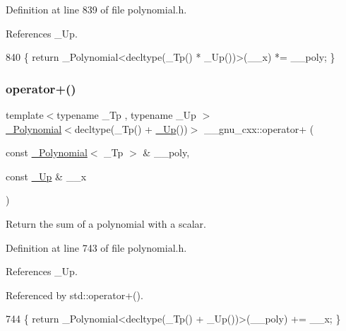 Definition at line 839 of file polynomial.\+h.



References \+\_\+\+Up.


\begin{DoxyCode}
840     \{ \textcolor{keywordflow}{return} \_Polynomial<decltype(\_Tp() * \_Up())>(\_\_x) *= \_\_poly; \}
\end{DoxyCode}
\mbox{\label{namespace____gnu__cxx_a2b408e7a7e5d2ec6879b8e40f7f5de3e}} 
\subsubsection{\texorpdfstring{operator+()}{operator+()}\hspace{0.1cm}{\footnotesize\ttfamily [1/3]}}
{\footnotesize\ttfamily template$<$typename \+\_\+\+Tp , typename \+\_\+\+Up $>$ \\
\hyperlink{class____gnu__cxx_1_1__Polynomial}{\+\_\+\+Polynomial}$<$decltype(\+\_\+\+Tp() + \hyperlink{namespace____gnu__cxx_ab693ea357b6429b331e0bf09f9442385}{\+\_\+\+Up}())$>$ \+\_\+\+\_\+gnu\+\_\+cxx\+::operator+ (\begin{DoxyParamCaption}\item[{const \hyperlink{class____gnu__cxx_1_1__Polynomial}{\+\_\+\+Polynomial}$<$ \+\_\+\+Tp $>$ \&}]{\+\_\+\+\_\+poly,  }\item[{const \hyperlink{namespace____gnu__cxx_ab693ea357b6429b331e0bf09f9442385}{\+\_\+\+Up} \&}]{\+\_\+\+\_\+x }\end{DoxyParamCaption})\hspace{0.3cm}{\ttfamily [inline]}}

Return the sum of a polynomial with a scalar. 

Definition at line 743 of file polynomial.\+h.



References \+\_\+\+Up.



Referenced by std\+::operator+().


\begin{DoxyCode}
744     \{ \textcolor{keywordflow}{return} \_Polynomial<decltype(\_Tp() + \_Up())>(\_\_poly) += \_\_x; \}
\end{DoxyCode}
\mbox{\label{namespace____gnu__cxx_ada8a28005b5f71563bec55c71e03029b}} 
